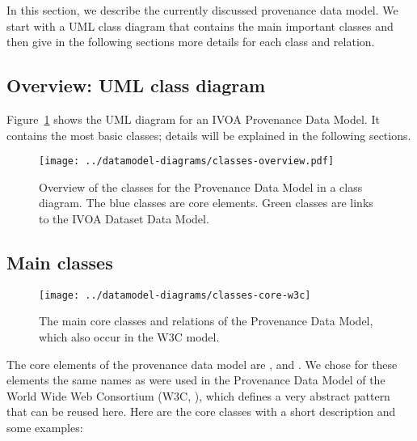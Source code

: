 In this section, we describe the currently discussed provenance data model. We 
start with a UML class diagram that contains the main important classes 
and then give in the following sections more details for each class and relation.

\subsection{Overview: UML class diagram}
Figure~\ref{fig:classdiagram} shows the UML diagram for an IVOA Provenance Data
Model. It contains the most basic classes; details will be explained in the following sections.

\begin{figure}[h]
\centering
\texttt{[image: ../datamodel-diagrams/classes-overview.pdf]}
\caption{Overview of the classes for the Provenance Data Model in a class diagram. The blue classes are core elements.
Green classes are links to the IVOA Dataset Data Model.}
\label{fig:classdiagram}
\end{figure}


\subsection{Main classes}\label{sec:core}

\begin{figure}[h]
\centering
\texttt{[image: ../datamodel-diagrams/classes-core-w3c]}
\caption{The main core classes and relations of the Provenance Data Model, which also occur in the W3C model.}
\label{fig:coreclasses}
\end{figure}


The core elements of the provenance data model are ,  and . 
We chose for these elements the same names as were used in the Provenance Data 
Model of the World Wide Web Consortium (W3C, \cite{std:W3CProvDM}), which defines 
a very abstract pattern that can be reused here. Here are the core classes with 
a short description and some examples:

